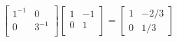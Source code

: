 \begin{enumerate}[label=\arabic*.]
\begin{mdframed}[style=MyFrame]
\begin{equation}
                \begin{bmatrix}
                    1^{-1}   &   0       \\
                    0        &   3^{-1}  \\
                \end{bmatrix}
                \begin{bmatrix}
                    1       &   -1  \\
                    0       &   1   \\
                \end{bmatrix}
                =
                \begin{bmatrix}
                    1           &      -2/3  \\
                    0           &       1/3
                \end{bmatrix}
            \end{equation}
        \end{mdframed}


\end{enumerate}

